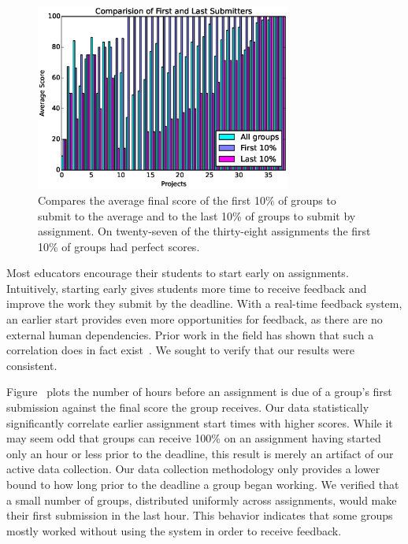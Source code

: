 \begin{figure}[!t]
\centering \includegraphics[width=3.3in]{graphs/Comparision_of_First_and_Last_Submitters.eps}
\caption{Compares the average final score of the first 10\% of groups to submit
  to the average and to the last 10\% of groups to submit by assignment. On
  twenty-seven of the thirty-eight assignments the first 10\% of groups had
  perfect scores.}
\end{figure}

Most educators encourage their students to start early on
assignments. Intuitively, starting early gives students more time to receive
feedback and improve the work they submit by the deadline. With a real-time
feedback system, an earlier start provides even more opportunities for
feedback, as there are no external human dependencies. Prior work in the field
has shown that such a correlation does in fact
exist~\cite{Spacco:2013:TIP:2462476.2465594,
  Edwards:2009:CEI:1584322.1584325}. We sought to verify that our results were
consistent.

Figure~ plots the number of hours before an
assignment is due of a group's first submission against the final score the
group receives. Our data statistically significantly correlate earlier
assignment start times with higher scores. While it may seem odd that groups
can receive 100\% on an assignment having started only an hour or less prior to
the deadline, this result is merely an artifact of our active data
collection. Our data collection methodology only provides a lower bound to how
long prior to the deadline a group began working. We verified that a small
number of groups, distributed uniformly across assignments, would make their
first submission in the last hour. This behavior indicates that some groups
mostly worked without using the system in order to receive feedback.

